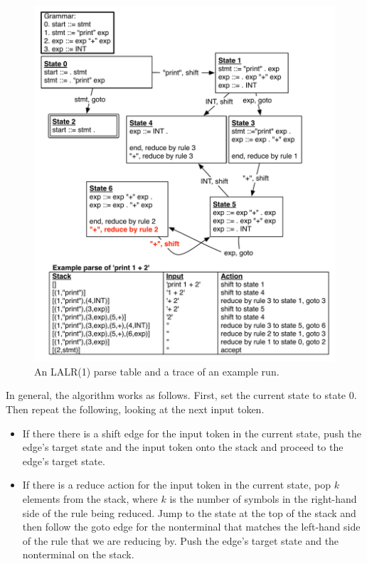 \documentclass[7x10]{TimesAPriori_MIT}%
\numberwithin{theorem}{chapter}
\numberwithin{definition}{chapter}
\numberwithin{equation}{chapter}
\begin{document}
{\begin{figure}[htbp]
  \centering
\includegraphics[width=5.0in]{figs/shift-reduce-conflict}  
  \caption{An LALR(1) parse table and a trace of an example run.}
  \label{fig:shift-reduce}
\end{figure}

In general, the algorithm works as follows. First, set the current state to
state $0$. Then repeat the following, looking at the next input token.
\begin{itemize}
\item If there there is a shift edge for the input token in the
  current state, push the edge's target state and the input token onto
  the stack and proceed to the edge's target state.
\item If there is a reduce action for the input token in the current
  state, pop $k$ elements from the stack, where $k$ is the number of
  symbols in the right-hand side of the rule being reduced. Jump to
  the state at the top of the stack and then follow the goto edge for
  the nonterminal that matches the left-hand side of the rule that we
  are reducing by. Push the edge's target state and the nonterminal on the
  stack.
\end{itemize}

}
\end{document}
